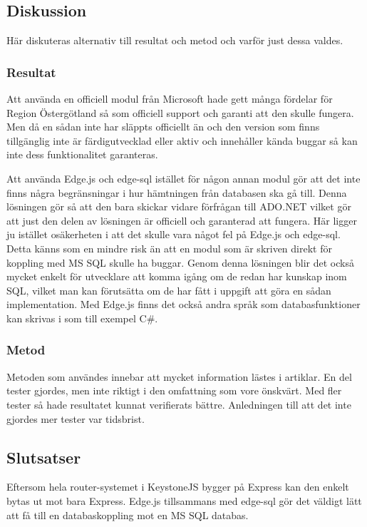 \subsection{Diskussion}
Här diskuteras alternativ till resultat och metod och varför just dessa valdes.
\subsubsection{Resultat}
Att använda en officiell modul från Microsoft hade gett många fördelar för Region Östergötland så som officiell support och garanti att den skulle fungera. Men då en sådan inte har släppts officiellt än och den version som finns tillgänglig inte är färdigutvecklad eller aktiv \cite{sqlGit} och innehåller kända buggar \cite{sqlBugs} så kan inte dess funktionalitet garanteras. 

Att använda Edge.js och edge-sql istället för någon annan modul gör att det inte finns några begränsningar i hur hämtningen från databasen ska gå till. Denna lösningen gör så att den bara skickar vidare förfrågan till ADO.NET vilket gör att just den delen av lösningen är officiell och garanterad att fungera. Här ligger ju istället osäkerheten i att det skulle vara något fel på Edge.js och edge-sql. Detta känns som en mindre risk än att en modul som är skriven direkt för koppling med MS SQL skulle ha buggar.
Genom denna lösningen blir det också mycket enkelt för utvecklare att komma igång om de redan har kunskap inom SQL, vilket man kan förutsätta om de har fått i uppgift att göra en sådan implementation. Med Edge.js finns det också andra språk som databasfunktioner kan skrivas i som till exempel C\#. 

\subsubsection{Metod}
Metoden som användes innebar att mycket information lästes i artiklar. En del tester gjordes, men inte riktigt i den omfattning som vore önskvärt. Med fler tester så hade resultatet kunnat verifierats bättre. Anledningen till att det inte gjordes mer tester var tidsbrist.

\subsection{Slutsatser}
Eftersom hela router-systemet i KeystoneJS bygger på Express kan den enkelt bytas ut mot bara Express. Edge.js tillsammans med edge-sql gör det väldigt lätt att få till en databaskoppling mot en MS SQL databas.
